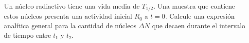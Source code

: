 \item Un núcleo radiactivo tiene una vida media de $T_{1/2}$. Una muestra que contiene estos núcleos presenta una actividad inicial $R_0$ a $t = 0$. Calcule una expresión analítica general para la cantidad de núcleos $\Delta N$ que decaen durante el intervalo de tiempo entre $t_1$ y $t_2$.